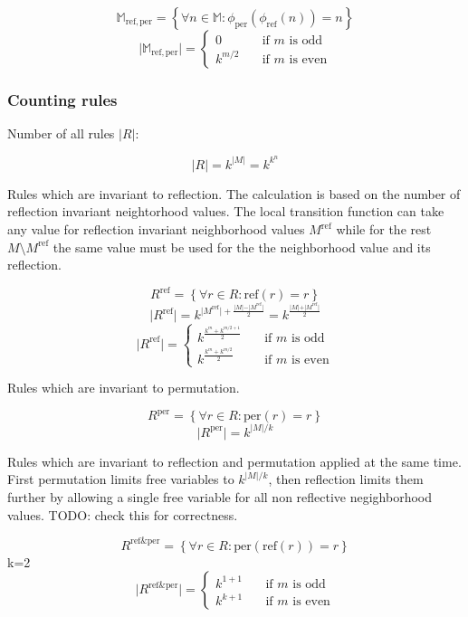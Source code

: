 \documentclass{ijuc}
\begin{document}
\[ \mathbb{M}_\mathrm{ref,per} = \left\{ \forall n \in \mathbb{M} : \phi_\mathrm{per}(\phi_\mathrm{ref}(n)) = n \right\} \]
\[ \vert \mathbb{M}_\mathrm{ref,per} \vert = \left\{ 
  \begin{array}{ll}
    {0        } & \quad \textrm{if $m$ is odd }\\
    {k^{m/2  }} & \quad \textrm{if $m$ is even}
  \end{array} \right.
\]

\subsubsection{Counting rules}

Number of all rules \(\vert R \vert\):

\[ \vert R \vert = k^{\vert M \vert} = k^{k^n} \]

Rules which are invariant to reflection. The calculation is based on the number of
reflection invariant neightorhood values. The local transition function can take any
value for reflection invariant neighborhood values \(M^\mathrm{ref}\) while for the
rest \(M  \setminus M^\mathrm{ref}\) the same value must be used
for the the neighborhood value and its reflection.

\[ R^\mathrm{ref} = \left\{ \forall r \in R : \mathrm{ref}(r) = r \right\} \]
\[ \vert R^\mathrm{ref} \vert = k^{ \vert M^\mathrm{ref} \vert + \frac{\vert M \vert - \vert M^\mathrm{ref} \vert}{2} } = k^{ \frac{\vert M \vert + \vert M^\mathrm{ref} \vert}{2} } \]
\[ \vert R^\mathrm{ref} \vert = \left\{ 
  \begin{array}{ll}
    k^{\frac{k^m + k^{m/2+1}}{2}} & \quad \textrm{if $m$ is odd }\\
    k^{\frac{k^m + k^{m/2  }}{2}} & \quad \textrm{if $m$ is even}
  \end{array} \right.
\]

Rules which are invariant to permutation.

\[ R^\mathrm{per} = \left\{ \forall r \in R : \mathrm{per}(r) = r \right\} \]
\[ \vert R^\mathrm{per} \vert = k^{\vert M \vert / k} \]

Rules which are invariant to reflection and permutation applied at the same time.
First permutation limits free variables to \(k^{\vert M \vert / k}\), then reflection
limits them further by allowing a single free variable for all non reflective negighborhood values.
TODO: check this for correctness.

\[ R^\mathrm{ref \& per} = \left\{ \forall r \in R : \mathrm{per}(\mathrm{ref}(r)) = r \right\} \]
k=2
\[ \vert R^\mathrm{ref \& per} \vert = \left\{ 
  \begin{array}{ll}
    k^{1 + 1} & \quad \textrm{if $m$ is odd }\\
    k^{k + 1} & \quad \textrm{if $m$ is even}
  \end{array} \right.
\]
\end{document}
